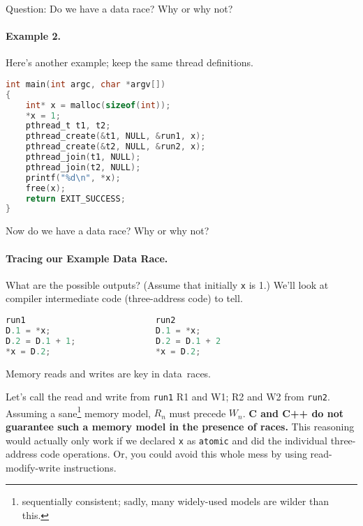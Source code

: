 \noindent
Question: Do we have a data race? Why or why not?
\vspace*{2em}

\paragraph{Example 2.} Here's another example; keep the same thread definitions.
\begin{lstlisting}[language=C]
int main(int argc, char *argv[])
{
    int* x = malloc(sizeof(int));
    *x = 1;
    pthread_t t1, t2;
    pthread_create(&t1, NULL, &run1, x);
    pthread_create(&t2, NULL, &run2, x);
    pthread_join(t1, NULL);
    pthread_join(t2, NULL);
    printf("%d\n", *x);
    free(x);
    return EXIT_SUCCESS;
}
\end{lstlisting}

Now do we have a data race? Why or why not?
\vspace*{2em}


\paragraph{Tracing our Example Data Race.} 
What are the possible outputs? (Assume that initially {\tt *x} is 1.)
We'll look at compiler intermediate code (three-address code) to tell.

\hspace*{.2\textwidth}\begin{minipage}{.8\textwidth}
\begin{lstlisting}[language=C]
run1                          run2   
D.1 = *x;                     D.1 = *x;
D.2 = D.1 + 1;                D.2 = D.1 + 2
*x = D.2;                     *x = D.2;
  \end{lstlisting}
\end{minipage}

Memory reads and writes are key in data~races.

Let's call the read and write from {\tt run1} R1 and W1; R2 and W2
from {\tt run2}. Assuming a sane\footnote{sequentially consistent; sadly, many
widely-used models are wilder than this.}
memory model, $R_n$ must precede $W_n$. {\bf C and C++ do not guarantee
  such a memory model in the presence of races.} This reasoning would
actually only work if we declared {\tt x} as {\tt atomic} and did the
individual three-address code operations. Or, you could avoid this whole
mess by using read-modify-write instructions.

